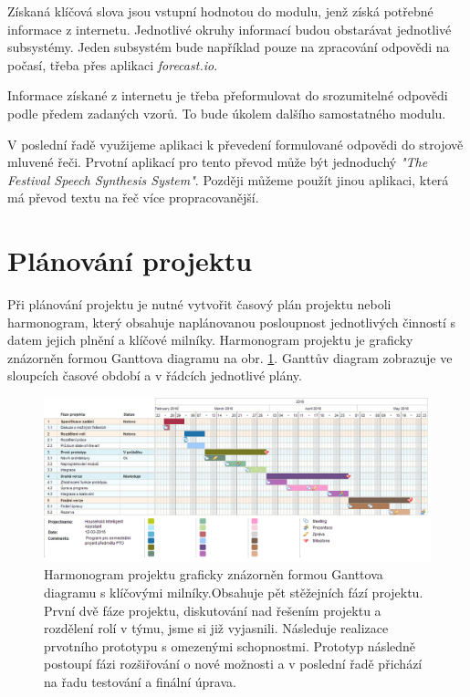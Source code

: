 \documentclass[12pt,a4paper]{article}
\begin{document}
Získaná klíčová slova jsou vstupní hodnotou do modulu, jenž získá potřebné informace z internetu. Jednotlivé okruhy informací budou obstarávat jednotlivé subsystémy. Jeden subsystém bude například pouze na zpracování odpovědi na počasí, třeba přes aplikaci \textit{forecast.io}.

Informace získané z internetu je třeba přeformulovat do srozumitelné odpovědi podle předem zadaných vzorů. To bude úkolem dalšího samostatného modulu.

V poslední řadě využijeme aplikaci k převedení formulované odpovědi do strojově mluvené řeči. Prvotní aplikací pro tento převod může být jednoduchý \textit{"The Festival Speech Synthesis System"}. Později můžeme použít jinou aplikaci, která má převod textu na řeč více propracovanější.


\section*{Plánování projektu}
Při plánování projektu je nutné vytvořit časový plán projektu neboli harmonogram, který obsahuje naplánovanou posloupnost jednotlivých činností s datem jejich plnění a klíčové milníky. Harmonogram projektu je graficky znázorněn formou Ganttova diagramu na obr. \ref{fig:diagram gantt}. Ganttův diagram zobrazuje ve sloupcích časové období a v řádcích jednotlivé plány. 

\begin{landscape}
\begin{figure}[ht]
	\begin{center}
	\includegraphics[height = 0.6\textheight ]{PTO-Gantt.png}
	\caption{Harmonogram projektu graficky znázorněn formou Ganttova diagramu s klíčovými milníky.Obsahuje pět stěžejních fází projektu. 
První dvě fáze projektu, diskutování nad řešením projektu a rozdělení rolí v týmu, jsme si již vyjasnili. Následuje realizace prvotního prototypu s omezenými schopnostmi. Prototyp následně postoupí fázi rozšiřování o nové možnosti a v poslední řadě přichází na řadu testování a finální úprava.}
	\label{fig:diagram gantt}
	\end{center}
\end{figure}
\end{landscape}
\end{document}
